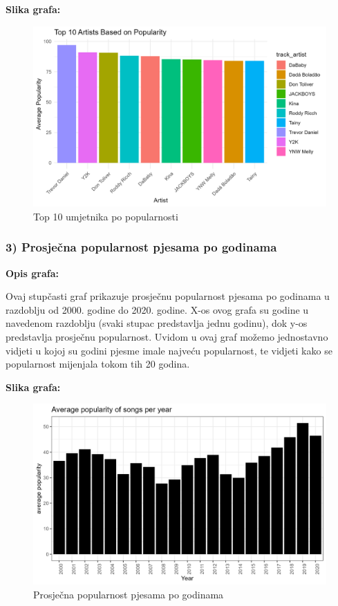 	\textbf{Slika grafa:}
	\begin{figure}[H]
		\includegraphics[scale=0.9]{slike/Top 10 popularity}
		\centering
		\caption{Top 10 umjetnika po popularnosti}
		
	\end{figure}


	\subsubsection{3) Prosječna popularnost pjesama po godinama}
	
	\textbf{Opis grafa:}
	
	Ovaj stupčasti graf prikazuje prosječnu popularnost pjesama po godinama u razdoblju od 2000. godine do 2020. godine. X-os ovog grafa su godine u navedenom razdoblju (svaki stupac predstavlja jednu godinu), dok y-os predstavlja prosječnu popularnost. 
	Uvidom u ovaj graf možemo jednostavno vidjeti u kojoj su godini pjesme imale najveću popularnost, te vidjeti kako se popularnost mijenjala tokom tih 20 godina.

	
	\textbf{Slika grafa:}
	\begin{figure}[H]
		\includegraphics[scale=0.9]{slike/Average popularity of songs per year.png}
		\centering
		\caption{Prosječna popularnost pjesama po godinama}
		
	\end{figure}
	
